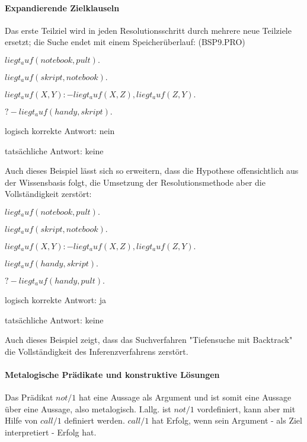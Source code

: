 \documentclass[a4paper]{article}
\begin{document}
\begin{multicols}{3}
  \paragraph{Expandierende Zielklauseln }
  Das erste Teilziel wird in jeden Resolutionsschritt durch mehrere neue Teilziele ersetzt; die Suche endet mit einem Speicherüberlauf: (BSP9.PRO)
  \begin{enumerate*}
    \item $liegt_auf( notebook , pult ).$
    \item $liegt_auf( skript , notebook ).$
    \item $liegt_auf(X,Y) :- liegt_auf(X,Z), liegt_auf(Z,Y).$
  \end{enumerate*}
  \begin{itemize*}
    \item $?- liegt_auf( handy , skript ).$
    \item logisch korrekte Antwort: nein
    \item tatsächliche Antwort: keine
  \end{itemize*}

  Auch dieses Beispiel lässt sich so erweitern, dass die Hypothese offensichtlich aus der Wissensbasis folgt, die Umsetzung der Resolutionsmethode aber die Vollständigkeit zerstört:
  \begin{enumerate*}
    \item $liegt_auf( notebook , pult ).$
    \item $liegt_auf( skript , notebook ).$
    \item $liegt_auf(X,Y) :- liegt_auf(X,Z), liegt_auf(Z,Y).$
    \item $liegt_auf( handy , skript ).$
  \end{enumerate*}
  \begin{itemize*}
    \item $?- liegt_auf( handy , pult ).$
    \item logisch korrekte Antwort: ja
    \item tatsächliche Antwort: keine
  \end{itemize*}

  Auch dieses Beispiel zeigt, dass das Suchverfahren "Tiefensuche mit Backtrack" die Vollständigkeit des Inferenzverfahrens zerstört.

  \paragraph{Metalogische Prädikate und konstruktive Lösungen}
  Das Prädikat $not/1$ hat eine Aussage als Argument und ist somit eine Aussage über eine Aussage, also metalogisch.
  I.allg. ist $not/1$ vordefiniert, kann aber mit Hilfe von $call/1$ definiert werden. $call/1$ hat Erfolg, wenn sein Argument - als Ziel interpretiert - Erfolg hat.


\end{multicols}
\end{document}
